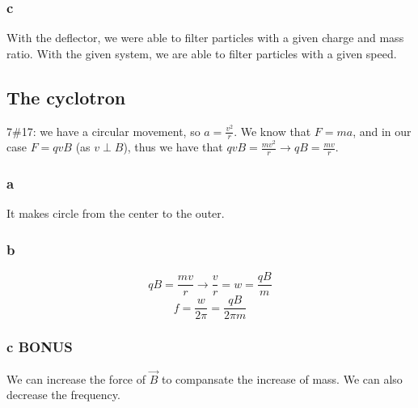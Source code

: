 \subsubsection{c}

With the deflector, we were able to filter particles with a given charge and
mass ratio. With the given system, we are able to filter particles with a given
speed.

\subsection{The cyclotron}

7\#17: we have a circular movement, so \(a = \frac{v^2}{r}\).
We know that \(F = ma\), and in our case \(F = qvB\) (as \(v \perp B\)),
thus we have that \(qvB = \frac{m v^2}{r} \to qB = \frac{mv}{r}\).

\subsubsection{a}
It makes circle from the center to the outer.

\subsubsection{b}
\[
	qB = \frac{mv}{r}
	\to \frac{v}{r} = w = \frac{qB}{m}
\]
\[
	f = \frac{w}{2 \pi} = \frac{qB}{2 \pi m}
\]

\subsubsection{c BONUS}
We can increase the force of \(\vec{B}\) to compansate the increase of mass.
We can also decrease the frequency.
